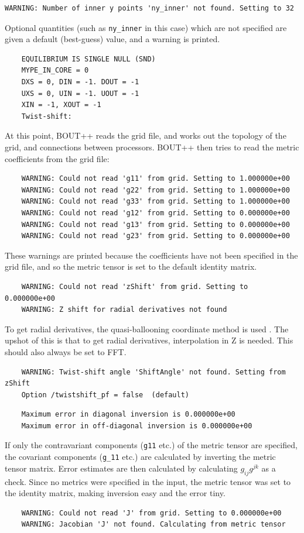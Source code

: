 \documentclass[12pt]{article}
\newcommand{\code}[1]{\texttt{#1}}
\begin{document}
\begin{verbatim}
WARNING: Number of inner y points 'ny_inner' not found. Setting to 32
\end{verbatim}
Optional quantities (such as \code{ny\_inner} in this case) which
are not specified are given a default (best-guess) value, and a warning is printed.
\begin{verbatim}
	EQUILIBRIUM IS SINGLE NULL (SND)
	MYPE_IN_CORE = 0
	DXS = 0, DIN = -1. DOUT = -1
	UXS = 0, UIN = -1. UOUT = -1
	XIN = -1, XOUT = -1
	Twist-shift:
\end{verbatim}
At this point, BOUT++ reads the grid file, and works out the topology of the grid,
and connections between processors.
BOUT++ then tries to read the metric coefficients from the grid file:
\begin{verbatim}
	WARNING: Could not read 'g11' from grid. Setting to 1.000000e+00
	WARNING: Could not read 'g22' from grid. Setting to 1.000000e+00
	WARNING: Could not read 'g33' from grid. Setting to 1.000000e+00
	WARNING: Could not read 'g12' from grid. Setting to 0.000000e+00
	WARNING: Could not read 'g13' from grid. Setting to 0.000000e+00
	WARNING: Could not read 'g23' from grid. Setting to 0.000000e+00
\end{verbatim}

These warnings are printed because the coefficients have not been specified in the
grid file, and so the metric tensor is set to the default identity matrix.

\begin{verbatim}
	WARNING: Could not read 'zShift' from grid. Setting to 0.000000e+00
	WARNING: Z shift for radial derivatives not found
\end{verbatim}
To get radial derivatives, the quasi-ballooning coordinate method is used
.
The upshot of this is that to get radial derivatives,
interpolation in Z is needed. This should also always be set to FFT.

\begin{verbatim}
	WARNING: Twist-shift angle 'ShiftAngle' not found. Setting from zShift
	Option /twistshift_pf = false  (default)
\end{verbatim}

\begin{verbatim}
	Maximum error in diagonal inversion is 0.000000e+00
	Maximum error in off-diagonal inversion is 0.000000e+00
\end{verbatim}
If only the contravariant components (\code{g11} etc.) of the metric tensor are specified,
the covariant components (\code{g\_11} etc.) are calculated by inverting the metric tensor matrix.
Error estimates are then calculated by calculating $g_{ij}g^{jk}$ as a check.
Since no metrics were specified in the input, the metric tensor was set to the identity
matrix, making inversion easy and the error tiny.
\begin{verbatim}
	WARNING: Could not read 'J' from grid. Setting to 0.000000e+00
	WARNING: Jacobian 'J' not found. Calculating from metric tensor
\end{verbatim}
\end{document}
